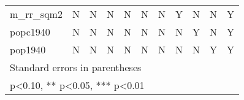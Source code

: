 \begin{table}[htbp]
\begin{tabular}{l*{10}{c}}
m\_rr\_sqm2   &         N   &         N   &         N   &         N   &         N   &         N   &         Y   &         N   &         N   &         Y   \\
popc1940    &         N   &         N   &         N   &         N   &         N   &         N   &         N   &         Y   &         N   &         Y   \\
pop1940     &         N   &         N   &         N   &         N   &         N   &         N   &         N   &         N   &         Y   &         Y   \\
\bottomrule
\multicolumn{11}{l}{\footnotesize Standard errors in parentheses}\\
\multicolumn{11}{l}{\footnotesize * p<0.10, ** p<0.05, *** p<0.01}\\
\end{tabular}
\end{table}
